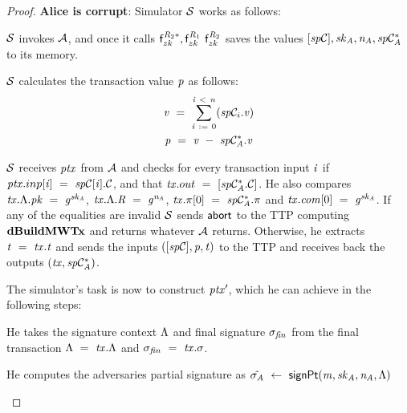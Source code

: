 \begin{proof}
    \textbf{Alice is corrupt}: Simulator $\mathcal{S}$ works as follows:
    \begin{asparaenum}
        \item $\mathcal{S}$ invokes $\mathcal{A}$, and once it calls $\mathsf{f}^{\mathit{R}_2*}_{zk}, \mathsf{f}^{\mathit{R}_1}_{zk}$ $\mathsf{f}^{\mathit{R}_2}_{zk}$ saves the values $[\mathit{sp}\mathcal{C}], \mathit{sk}_{\mathit{A}}, \mathit{\mathit{n}_{\mathit{A}}}, \mathit{sp}\mathcal{C}_{\mathit{A}}^*$ to its memory.
        \item $\mathcal{S}$ calculates the transaction value $\mathit{p}$ as follows:
        \begin{gather*}
            \mathit{v} ~=~ \sum_{\mathit{i} ~:=~ 0}^{\mathit{i} ~<~ \mathit{n}}(\mathit{sp}\mathcal{C}_i.\mathit{v}) \\
            \mathit{p} ~=~ \mathit{v} ~-~ \mathit{sp}\mathcal{C}_{\mathit{A}}^*.\mathit{v}
        \end{gather*}
        \item $\mathcal{S}$ receives $\mathit{ptx}$ from $\mathcal{A}$ and checks for every transaction input $\mathit{i}$ if $\mathit{ptx}.inp[\mathit{i}] ~=~ \mathit{sp}\mathcal{C}[\mathit{i}].\mathcal{C}$, and that $\mathit{tx}.out ~=~ [\mathit{sp}\mathcal{C}_{\mathit{A}}^*.\mathcal{C}]$.
        He also compares $\mathit{tx}.\Lambda.\mathit{pk} ~=~ \mathit{g}^{\mathit{sk}_{\mathit{A}}}$, $\mathit{tx}.\Lambda.\mathit{R} ~=~ \mathit{g}^{\mathit{\mathit{n}_{\mathit{A}}}}$, $\mathit{tx}.\pi[0] ~=~ \mathit{sp}\mathcal{C}_{\mathit{A}}^*.\pi$ and $\mathit{tx}.\mathit{com}[0] ~=~ \mathit{g}^{\mathit{sk}_{\mathit{A}}}$.
        If any of the equalities are invalid $\mathcal{S}$ sends $\mathsf{abort}$ to the TTP computing $\mathbf{dBuildMWTx}$ and returns whatever $\mathcal{A}$ returns.
        Otherwise, he extracts $\mathit{t} ~=~ \mathit{tx}.\mathit{t}$ and sends the inputs $([\mathit{sp}\mathcal{C}], \mathit{p}, \mathit{t})$ to the TTP and receives back the outputs $(\mathit{tx}, \mathit{sp}\mathcal{C}_{\mathit{A}}^*)$.
        \item The simulator's task is now to construct ${\mathit{ptx}}'$, which he can achieve in the following steps:
        \begin{asparaenum}
            \item He takes the signature context $\Lambda$ and final signature $\sigma_{\mathit{fin}}$ from the final transaction $\Lambda ~=~ \mathit{tx}.\Lambda$ and $\sigma_{\mathit{fin}} ~=~ \mathit{tx}.\sigma$.
            \item He computes the adversaries partial signature as $\tilde{\sigma_{\mathit{A}}} ~\leftarrow~ \mathsf{signPt}(\mathit{m}, \mathit{sk}_{\mathit{A}}, \mathit{\mathit{n}_{\mathit{A}}}, \Lambda)$

\end{asparaenum}
\end{asparaenum}
\end{proof}
